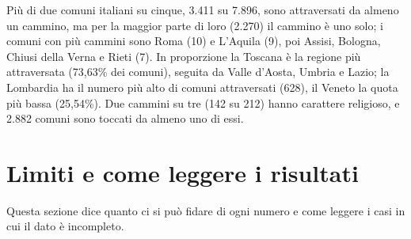 Più di due comuni italiani su cinque, 3.411 su 7.896, sono attraversati da almeno un cammino, ma per la maggior parte di loro (2.270) il cammino è uno solo; i comuni con più cammini sono Roma (10) e L'Aquila (9), poi Assisi, Bologna, Chiusi della Verna e Rieti (7). In proporzione la Toscana è la regione più attraversata (73,63\% dei comuni), seguita da Valle d'Aosta, Umbria e Lazio; la Lombardia ha il numero più alto di comuni attraversati (628), il Veneto la quota più bassa (25,54\%). Due cammini su tre (142 su 212) hanno carattere religioso, e 2.882 comuni sono toccati da almeno uno di essi.

\FloatBarrier

\section{Limiti e come leggere i risultati}\label{sec:limiti}

Questa sezione dice quanto ci si può fidare di ogni numero e come leggere i casi in cui il dato è incompleto.

